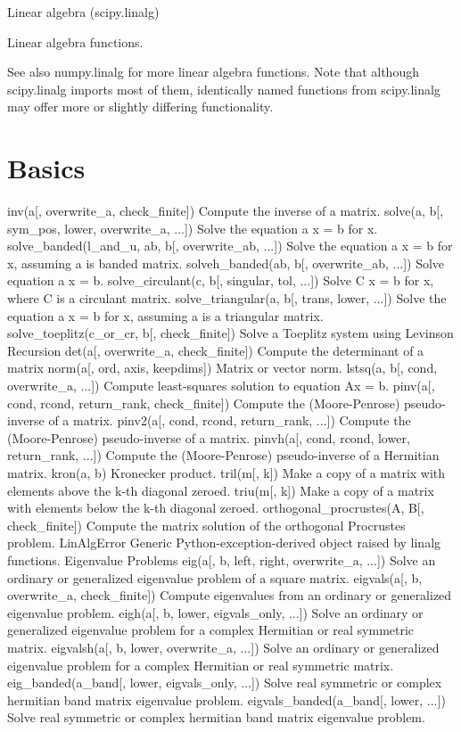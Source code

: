 Linear algebra (scipy.linalg)

Linear algebra functions.

See also
numpy.linalg for more linear algebra functions. Note that although scipy.linalg imports most of them, identically named functions from scipy.linalg may offer more or slightly differing functionality.

\newpage
\section{Basics}
inv(a[, overwrite_a, check_finite])	Compute the inverse of a matrix.
solve(a, b[, sym_pos, lower, overwrite_a, ...])	Solve the equation a x = b for x.
solve_banded(l_and_u, ab, b[, overwrite_ab, ...])	Solve the equation a x = b for x, assuming a is banded matrix.
solveh_banded(ab, b[, overwrite_ab, ...])	Solve equation a x = b.
solve_circulant(c, b[, singular, tol, ...])	Solve C x = b for x, where C is a circulant matrix.
solve_triangular(a, b[, trans, lower, ...])	Solve the equation a x = b for x, assuming a is a triangular matrix.
solve_toeplitz(c_or_cr, b[, check_finite])	Solve a Toeplitz system using Levinson Recursion
det(a[, overwrite_a, check_finite])	Compute the determinant of a matrix
norm(a[, ord, axis, keepdims])	Matrix or vector norm.
lstsq(a, b[, cond, overwrite_a, ...])	Compute least-squares solution to equation Ax = b.
pinv(a[, cond, rcond, return_rank, check_finite])	Compute the (Moore-Penrose) pseudo-inverse of a matrix.
pinv2(a[, cond, rcond, return_rank, ...])	Compute the (Moore-Penrose) pseudo-inverse of a matrix.
pinvh(a[, cond, rcond, lower, return_rank, ...])	Compute the (Moore-Penrose) pseudo-inverse of a Hermitian matrix.
kron(a, b)	Kronecker product.
tril(m[, k])	Make a copy of a matrix with elements above the k-th diagonal zeroed.
triu(m[, k])	Make a copy of a matrix with elements below the k-th diagonal zeroed.
orthogonal_procrustes(A, B[, check_finite])	Compute the matrix solution of the orthogonal Procrustes problem.
LinAlgError	Generic Python-exception-derived object raised by linalg functions.
Eigenvalue Problems
eig(a[, b, left, right, overwrite_a, ...])	Solve an ordinary or generalized eigenvalue problem of a square matrix.
eigvals(a[, b, overwrite_a, check_finite])	Compute eigenvalues from an ordinary or generalized eigenvalue problem.
eigh(a[, b, lower, eigvals_only, ...])	Solve an ordinary or generalized eigenvalue problem for a complex Hermitian or real symmetric matrix.
eigvalsh(a[, b, lower, overwrite_a, ...])	Solve an ordinary or generalized eigenvalue problem for a complex Hermitian or real symmetric matrix.
eig_banded(a_band[, lower, eigvals_only, ...])	Solve real symmetric or complex hermitian band matrix eigenvalue problem.
eigvals_banded(a_band[, lower, ...])	Solve real symmetric or complex hermitian band matrix eigenvalue problem.

